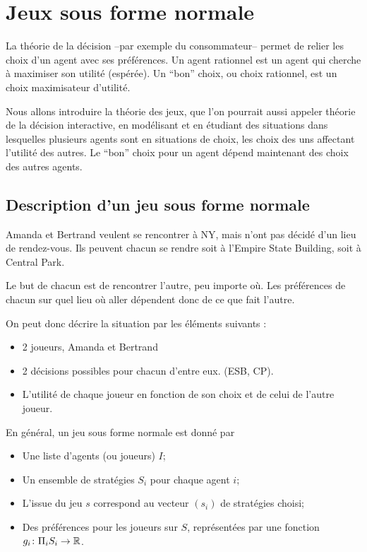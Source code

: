 \chapter{Jeux sous forme normale}
La théorie de la décision --par exemple du consommateur-- permet
de relier les choix d'un agent avec ses préférences. Un agent
rationnel est un agent qui cherche à maximiser son utilité
(espérée). Un ``bon'' choix, ou choix rationnel, est un choix
maximisateur d'utilité.

Nous allons introduire la théorie des jeux, que l'on pourrait
aussi appeler théorie de la décision interactive, en modélisant et
en étudiant des situations dans lesquelles plusieurs agents sont en
situations de choix, les choix des uns affectant l'utilité des
autres. Le ``bon'' choix pour un agent dépend maintenant des choix
des autres agents.

\section{Description d'un jeu sous forme normale}
\begin{exemple}
Amanda et Bertrand veulent se rencontrer à NY, mais n'ont pas
décidé d'un lieu de rendez-vous. Ils peuvent chacun se rendre soit
à l'Empire State Building, soit à Central Park.

Le but de chacun est de rencontrer l'autre, peu importe où. Les
préférences de chacun sur quel lieu o\`u aller dépendent donc de
ce que fait l'autre.

On peut donc décrire la situation par les éléments suivants :
\begin{itemize}
\item 2 joueurs, Amanda et Bertrand %
\item 2 décisions possibles pour chacun d'entre eux. (ESB, CP).%
\item L'utilité de chaque joueur en fonction de son choix et de celui
de l'autre joueur.
\end{itemize}
\end{exemple}

En général, un jeu sous forme normale est donné par
\begin{itemize}
\item  Une liste d'agents (ou joueurs) $I$; %
\item  Un ensemble de stratégies $S_i$ pour chaque agent $i$;%
\item  L'issue du jeu $s$ correspond au vecteur $(s_i)$ de
stratégies choisi; %
\item Des préférences pour les joueurs sur $S$,
représentées par une fonction $g_i \colon \Pi_i S_i\to \mathbb R$.
\end{itemize}

